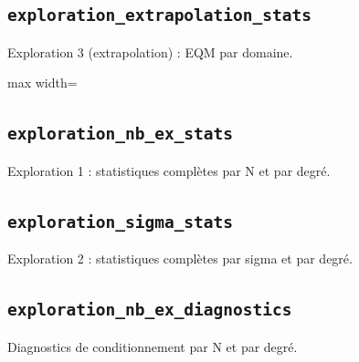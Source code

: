 \documentclass[a4paper,10pt]{article}
\newcommand{\tablesroot}{results/tables}
\begin{document}
\noindent\begin{minipage}{\linewidth}
\subsection*{\texttt{exploration\_extrapolation\_stats}}
Exploration 3 (extrapolation) : EQM par domaine.
\par
\begingroup\centering\footnotesize
\begin{adjustbox}{max width=\linewidth}

\end{adjustbox}\par
\endgroup
\end{minipage}
\par\medskip

\noindent\begin{minipage}{\linewidth}
\subsection*{\texttt{exploration\_nb\_ex\_stats}}
Exploration 1 : statistiques compl\`etes par N et par degr\'e.
\par
\end{minipage}\par
\addtocounter{table}{-1}
\begingroup\footnotesize

\endgroup
\par\medskip

\noindent\begin{minipage}{\linewidth}
\subsection*{\texttt{exploration\_sigma\_stats}}
Exploration 2 : statistiques compl\`etes par sigma et par degr\'e.
\par
\end{minipage}\par
\addtocounter{table}{-1}
\begingroup\footnotesize

\endgroup
\par\medskip

\noindent\begin{minipage}{\linewidth}
\subsection*{\texttt{exploration\_nb\_ex\_diagnostics}}
Diagnostics de conditionnement par N et par degr\'e.
\par
\end{minipage}\par
\addtocounter{table}{-1}
\begingroup\footnotesize

\endgroup
\par\medskip
\end{document}

